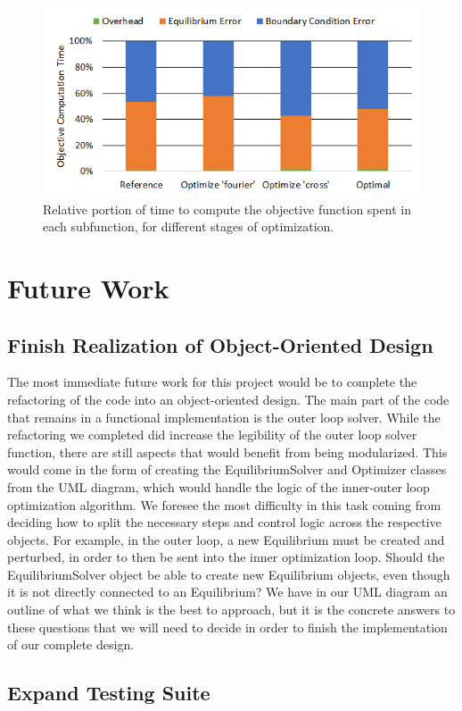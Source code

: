\documentclass{article}
\begin{document}
%
\begin{figure}[H]
	\centering
	\includegraphics[width=0.6\linewidth,center]{./figs/compute_time_rel.png}
	\caption{Relative portion of time to compute the objective function spent in each subfunction, for different stages of optimization.}
	\label{fig:compute_time_rel}
\end{figure}

\section{Future Work}

\subsection{Finish Realization of Object-Oriented Design}

The most immediate future work for this project would be to complete the refactoring of the code into an object-oriented design.
The main part of the code that remains in a functional implementation is the outer loop solver.
While the refactoring we completed did increase the legibility of the outer loop solver function, there are still aspects that would benefit from being modularized.
This would come in the form of creating the EquilibriumSolver and Optimizer classes from the UML diagram, which would handle the logic of the inner-outer loop optimization algorithm.
We foresee the most difficulty in this task coming from deciding how to split the necessary steps and control logic across the respective objects.
For example, in the outer loop, a new Equilibrium must be created and perturbed, in order to then be sent into the inner optimization loop.
Should the EquilibriumSolver object be able to create new Equilibrium objects, even though it is not directly connected to an Equilibrium?
We have in our UML diagram an outline of what we think is the best to approach, but it is the concrete answers to these questions that we will need to decide in order to finish the implementation of our complete design.

\subsection{Expand Testing Suite}
\end{document}

